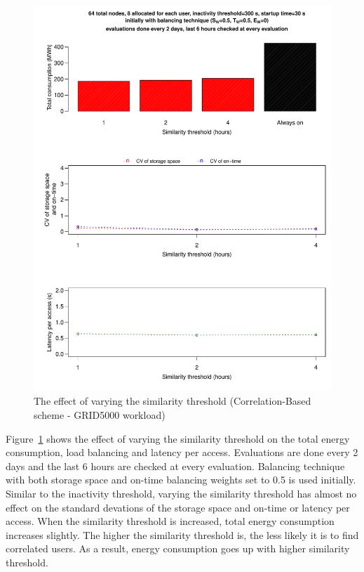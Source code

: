 \documentclass[preprint,12pt]{elsarticle}
\begin{document}
\begin{figure}[!htbp]
\centering
\includegraphics[width=\columnwidth,keepaspectratio]{FIG13.pdf}
\caption{The effect of varying the similarity threshold (Correlation-Based scheme - GRID5000 workload)}
\label{eightthresult}
\end{figure} 

Figure~\ref{eightthresult} shows the effect of varying the similarity threshold on the total energy
consumption, load balancing and latency per access. Evaluations are done every 2 days and the last 6 hours
are checked at every evaluation. Balancing technique with both storage space and on-time balancing
weights set to 0.5 is used initially. Similar to the inactivity threshold, varying the
similarity threshold has almost no effect on the standard devations of the storage space and on-time
or latency per access. When the similarity threshold is increased, total energy consumption
increases slightly. The higher the similarity threshold is, the less likely it is to find correlated
users. As a result, energy consumption goes up with higher similarity threshold.
\end{document}
